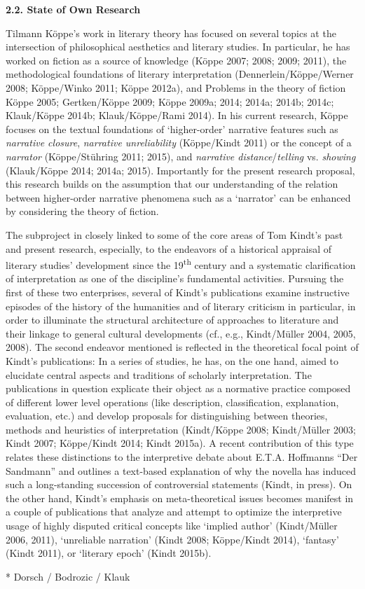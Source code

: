 

\noindent\textbf{\large 2.2. State of Own Research}

\vspace{.2cm}
\noindent Tilmann K\"oppe's work in literary theory has focused on several topics at the intersection of philosophical aesthetics and literary studies. In particular, he has worked on fiction as a source of knowledge (K\"oppe 2007; 2008; 2009; 2011), the methodological foundations of literary interpretation (Dennerlein/K\"oppe/Werner 2008; K\"oppe/Winko 2011; K\"oppe 2012a), and Problems in the theory of fiction K\"oppe 2005; Gertken/K\"oppe 2009; K\"oppe 2009a; 2014; 2014a; 2014b; 2014c; Klauk/K\"oppe 2014b; Klauk/K\"oppe/Rami 2014). In his current research, K\"oppe focuses on the textual foundations of `higher-order' narrative features such as \emph{narrative closure}, \emph{narrative unreliability} (K\"oppe/Kindt 2011) or the concept of a \emph{narrator} (K\"oppe/St\"uhring 2011; 2015), and \emph{narrative distance}/\emph{telling} vs. \emph{showing} (Klauk/K\"oppe 2014; 2014a; 2015). Importantly for the present research proposal, this research builds on the assumption that our understanding of the relation between higher-order narrative phenomena such as a `narrator' can be enhanced by considering the theory of fiction.

The subproject in closely linked to some of the core areas of Tom Kindt's past and present research, especially, to the endeavors of a historical appraisal of literary studies' development since the 19\textsuperscript{th} century and a systematic clarification of interpretation as one of the discipline's fundamental activities. Pursuing the first of these two enterprises, several of Kindt's publications examine instructive episodes of the history of the humanities and of literary criticism in particular, in order to illuminate the structural architecture of approaches to literature and their linkage to general cultural developments (cf., e.g., Kindt/M\"uller 2004, 2005, 2008). The second endeavor mentioned is reflected in the theoretical focal point of Kindt's publications: In a series of studies, he has, on the one hand, aimed to elucidate central aspects and traditions of scholarly interpretation. The publications in question explicate their object as a normative practice composed of different lower level operations (like description, classification, explanation, evaluation, etc.) and develop proposals for distinguishing between theories, methods and heuristics of interpretation (Kindt/K\"oppe 2008; Kindt/M\"uller 2003; Kindt 2007; K\"oppe/Kindt 2014; Kindt 2015a). A recent contribution of this type relates these distinctions to the interpretive debate about E.T.A. Hoffmanns ``Der Sandmann'' and outlines a text-based explanation of why the novella has induced such a long-standing succession of controversial statements (Kindt, in press). On the other hand, Kindt's emphasis on meta-theoretical issues becomes manifest in a couple of publications that analyze and attempt to optimize the
interpretive usage of highly disputed critical concepts like `implied author' (Kindt/M\"uller 2006, 2011), `unreliable narration' (Kindt 2008; K\"oppe/Kindt 2014), `fantasy' (Kindt 2011), or `literary epoch' (Kindt 2015b).

* Dorsch / Bodrozic / Klauk